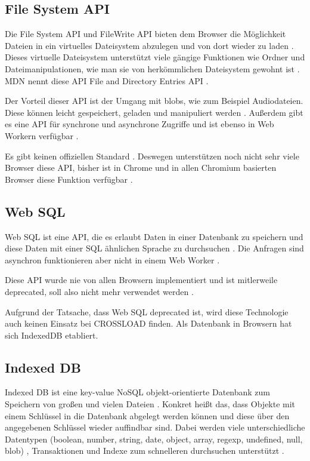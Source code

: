 \subsection{File System API}
Die File System \ac{API} und FileWrite \ac{API} bieten dem Browser die Möglichkeit Dateien in ein virtuelles Dateisystem abzulegen und von dort wieder zu laden \autocite{Hajian2019} \autocite{storage-for-the-web}. Dieses virtuelle Dateisystem unterstützt viele gängige Funktionen wie Ordner und Dateimanipulationen, wie man sie von herkömmlichen Dateisystem gewohnt ist \autocite{mdn-file-system}. MDN nennt diese \ac{API} File and Directory Entries \ac{API} \autocite{mdn-file-system}. 

Der Vorteil dieser \ac{API} ist der Umgang mit \acp{blob}, wie zum Beispiel Audiodateien. Diese können leicht gespeichert, geladen und manipuliert werden \autocite{mdn-file-system}. Außerdem gibt es eine \ac{API} für synchrone und asynchrone Zugriffe und ist ebenso in Web Workern verfügbar \autocite{Hajian2019}. 

Es gibt keinen offiziellen Standard \autocite{mdn-file-system} \autocite{caniuse-filesystem}. Deswegen unterstützen noch nicht sehr viele Browser diese \ac{API}, bisher ist in Chrome und in allen Chromium basierten Browser diese Funktion verfügbar \autocite{caniuse-filesystem}.

\subsection{Web SQL}
Web SQL ist eine \ac{API}, die es erlaubt Daten in einer Datenbank zu speichern und diese Daten mit einer SQL ähnlichen Sprache zu durchsuchen \autocite{w3-web-sql}. Die Anfragen sind asynchron funktionieren aber nicht in einem Web Worker \autocite{Hajian2019}.

Diese \ac{API} wurde nie von allen Browsern implementiert und ist mitlerweile deprecated, soll also nicht mehr verwendet werden \autocite{Hajian2019}.

Aufgrund der Tatsache, dass Web SQL deprecated ist, wird diese Technologie auch keinen Einsatz bei CROSSLOAD finden. Als Datenbank in Browsern hat sich IndexedDB etabliert.

\subsection{Indexed DB}
Indexed DB ist eine key-value NoSQL objekt-orientierte Datenbank zum Speichern von großen und vielen Dateien \autocite{Hajian2019}. Konkret heißt das, dass Objekte mit einem Schlüssel in die Datenbank abgelegt werden können und diese über den angegebenen Schlüssel wieder auffindbar sind. Dabei werden viele unterschiedliche Datentypen (boolean, number, string, date, object, array, regexp, undefined, null, \ac{blob}) \autocite{mdn-indexeddb}, Transaktionen und Indexe zum schnelleren durchsuchen unterstützt \autocite{Sheppard2017}. 


